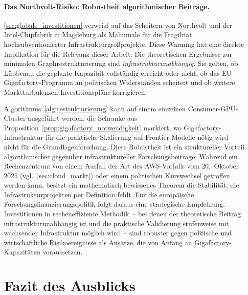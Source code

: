 \documentclass[12pt, a4paper, openany]{report}
\begin{document}
\paragraph{Das Northvolt-Risiko: Robustheit algorithmischer Beiträge.}
\cref{sec:globale_investitionen} verweist auf das Scheitern von
Northvolt und der Intel-Chipfabrik in Magdeburg als Mahnmale für die
Fragilität hochsubventionierter Infrastrukturgroßprojekte.  Diese
Warnung hat eine direkte Implikation für die Relevanz dieser Arbeit:
Die theoretischen Ergebnisse zur minimalen Graphrestrukturierung sind
\emph{infrastrukturunabhängig}.  Sie gelten, ob Lübbenau die geplante
Kapazität vollständig erreicht oder nicht, ob das EU-Gigafactory-Programm
an politischen Widerständen scheitert und ob weitere Marktturbulenzen
Investitionspläne korrigieren.

Algorithmus~\ref{alg:restrukturierung} kann auf einem einzelnen
Consumer-GPU-Cluster ausgeführt werden; die Schranke aus
Proposition~\ref{prop:gigafactory_notwendigkeit} markiert, wo
Gigafactory-Infrastruktur für die praktische Skalierung auf
Frontier-Modelle nötig wird~-- nicht für die Grundlagenforschung.
Diese Robustheit ist ein struktureller Vorteil algorithmischer
gegenüber infrastruktureller Forschungsbeiträge: Während ein
Rechenzentrum von einem Ausfall der Art des AWS-Vorfalls vom
20.~Oktober 2025 (vgl.\ \cref{sec:cloud_markt}) oder einem
politischen Kurswechsel getroffen werden kann, besitzt ein mathematisch
bewiesenes Theorem die Stabilität, die Infrastrukturprojekten per
Definition fehlt.  Für die europäische Forschungsfinanzierungspolitik
folgt daraus eine strategische Empfehlung: Investitionen in
recheneffiziente Methodik~-- bei denen der theoretische Beitrag
infrastrukturunabhängig ist und die praktische Validierung stufenweise
mit wachsender Infrastruktur möglich wird~-- sind robuster gegen
politische und wirtschaftliche Risikoereignisse als Ansätze, die von
Anfang an Gigafactory-Kapazitäten voraussetzen.

\section*{Fazit des Ausblicks}
\end{document}
